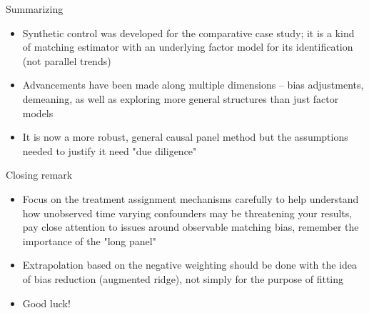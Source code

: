 \documentclass{beamer}
\begin{document}
\begin{frame}{Summarizing}


\begin{itemize}

\item Synthetic control was developed for the comparative case study; it is a kind of matching estimator with an underlying factor model for its identification (not parallel trends)
\item Advancements have been made along multiple dimensions -- bias adjustments, demeaning, as well as exploring more general structures than just factor models
\item It is now a more robust, general causal panel method but the assumptions needed to justify it need "due diligence" 

\end{itemize}

\end{frame}

\begin{frame}{Closing remark}

\begin{itemize}
\item Focus on the treatment assignment mechanisms carefully to help understand how unobserved time varying confounders may be threatening your results, pay close attention to issues around observable matching bias, remember the importance of the "long panel"
\item Extrapolation based on the negative weighting should be done with the idea of bias reduction (augmented ridge), not simply for the purpose of fitting
\item Good luck!

\end{itemize}

\end{frame}
\end{document}
